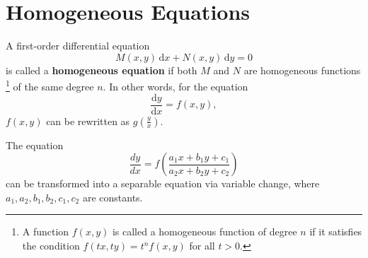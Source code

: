 \documentclass[11pt]{../../TexTemplate/elegantbook}
\begin{document}
\section{Homogeneous Equations}
\begin{definition}\label{def:homogeneous equations}
    A first-order differential equation 
    \begin{equation*}
        M(x, y) \, \mathrm{d}x + N(x, y) \, \mathrm{d}y = 0
    \end{equation*}
    is called a \textbf{homogeneous equation} if both \(M\) and \(N\) are homogeneous functions
    \footnote{
        A function \(f(x, y)\) is called a homogeneous function of degree \(n\) 
        if it satisfies the condition \(f(tx, ty) = t^n f(x, y)\) for all \(t > 0\).
        }
    of the same degree \(n\).    
    In other words, for the equation
    \[
        \frac{\mathrm{d}y}{\mathrm{d}x} = f(x, y), 
    \]
    \(f(x,y)\) can be rewritten as \(g\left(\frac{y}{x}\right)\).
\end{definition}


The equation  
\begin{equation}\label{eq:Second kind separable equation}
    \frac{dy}{dx} = f\left(\frac{a_1x + b_1y + c_1}{a_2x + b_2y + c_2}\right) 
\end{equation}
can be transformed into a separable equation via variable change, 
where \(a_1, a_2, b_1, b_2, c_1, c_2\) are constants. 
\end{document}

